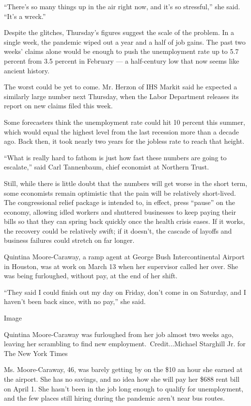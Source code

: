 ``There's so many things up in the air right now, and it's so
stressful,'' she said. ``It's a wreck.''

Despite the glitches, Thursday's figures suggest the scale of the
problem. In a single week, the pandemic wiped out a year and a half of
job gains. The past two weeks' claims alone would be enough to push the
unemployment rate up to 5.7 percent from 3.5 percent in February --- a
half-century low that now seems like ancient history.

The worst could be yet to come. Mr. Herzon of IHS Markit said he
expected a similarly large number next Thursday, when the Labor
Department releases its report on new claims filed this week.

Some forecasters think the unemployment rate could hit 10 percent this
summer, which would equal the highest level from the last recession more
than a decade ago. Back then, it took nearly two years for the jobless
rate to reach that height.

``What is really hard to fathom is just how fast these numbers are going
to escalate,'' said Carl Tannenbaum, chief economist at Northern Trust.

Still, while there is little doubt that the numbers will get worse in
the short term, some economists remain optimistic that the pain will be
relatively short-lived. The congressional relief package is intended to,
in effect, press ``pause'' on the economy, allowing idled workers and
shuttered businesses to keep paying their bills so that they can spring
back quickly once the health crisis eases. If it works, the recovery
could be relatively swift; if it doesn't, the cascade of layoffs and
business failures could stretch on far longer.

Quintina Moore-Caraway, a ramp agent at George Bush Intercontinental
Airport in Houston, was at work on March 13 when her supervisor called
her over. She was being furloughed, without pay, at the end of her
shift.

``They said I could finish out my day on Friday, don't come in on
Saturday, and I haven't been back since, with no pay,'' she said.

Image

Quintina Moore-Caraway was furloughed from her job almost two weeks ago,
leaving her scrambling to find new employment.~Credit...Michael
Starghill Jr. for The New York Times

Ms. Moore-Caraway, 46, was barely getting by on the \$10 an hour she
earned at the airport. She has no savings, and no idea how she will pay
her \$688 rent bill on April 1. She hasn't been in the job long enough
to qualify for unemployment, and the few places still hiring during the
pandemic aren't near bus routes.

